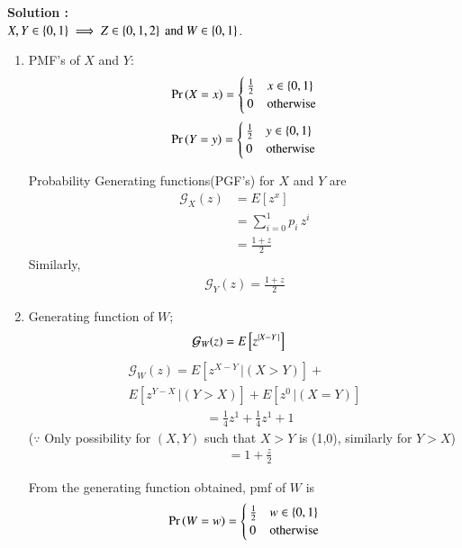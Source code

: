 \documentclass[journal,12pt,twocolumn]{IEEEtran}
\begin{document}
\textbf{Solution :}\\
$X, Y \in \left\{0,1\right\}
\implies Z \in \left\{0,1,2\right\} \text{ and } W \in \left\{0,1\right\}$.
\begin{enumerate}
 \item PMF's of $X$ and $Y$:
 \begin{equation}
         \Pr\left(X=x\right) = 
     \begin{cases}
      \frac{1}{2} & x \in \left\{0,1\right\}\\
      0 & \text{otherwise}
     \end{cases}
 \end{equation}
  \begin{equation}
         \Pr\left(Y=y\right) = 
     \begin{cases}
      \frac{1}{2} & y \in \left\{0,1\right\}\\
      0 & \text{otherwise}
     \end{cases}
 \end{equation}

Probability Generating functions(PGF's) for $X$ and $Y$ are
\begin{align}
    \mathcal{G}_{X}(z) &= E[z^x]\\
                       &= \sum_{i=0}^{1}p_i\,z^i\\
                       &=\frac{1+z}{2}
\end{align}
Similarly,
\begin{align}
    \mathcal{G}_{Y}(z) = \frac{1+z}{2}
\end{align}

  \item Generating function of $W$;
\begin{align}
    \mathcal{G}_W(z) &= E\left[z^{\vert X-Y\,\vert}\right]
\end{align}
\begin{multline}
  \mathcal{G}_W(z) = E\left[z^{X-Y}\,|(X>Y)\right] +\\ E\left[z^{Y-X}\,|(Y>X)\right] + E\left[z^0\,|(X=Y)\right]
\end{multline}
\begin{align}
    &= \frac{1}{4}z^1 + \frac{1}{4}z^1+1
\end{align}
($\because$ Only possibility for $(X,Y)$ such that $X>Y$ is (1,0), similarly for $Y>X$)
\begin{align}
  &= 1+\frac{z}{2}
\end{align}

From the generating function obtained, pmf of $W$ is
\begin{equation}
   \Pr\left(W=w\right) =
    \begin{cases}
      \frac{1}{2} & w \in \left\{0,1\right\}\\
      0 & \text{otherwise}
    \end{cases}       
\end{equation}


\end{enumerate}
\end{document}
